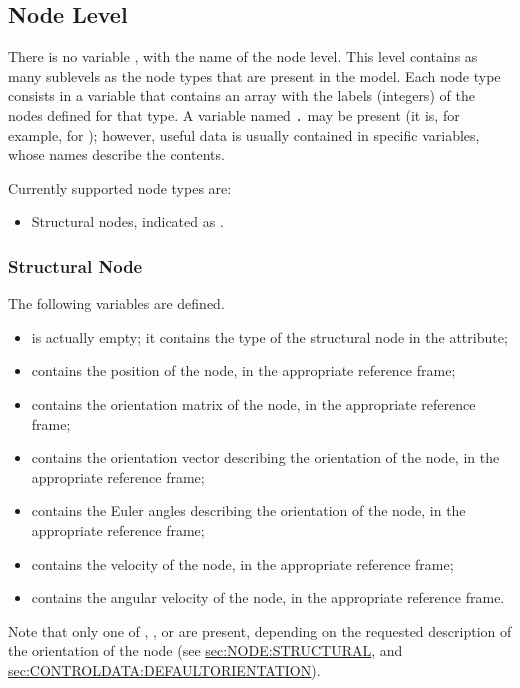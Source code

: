 \subsection{Node Level}
There is no variable , with the name of the node level.
This level contains as many sublevels as the node types
that are present in the model.
Each node type consists in a variable that contains an array
with the labels (integers) of the nodes defined for that type.
A variable named \texttt{.} may be present
(it is, for example, for ); however, useful data is usually
contained in specific variables, whose names describe the contents.

Currently supported node types are:
\begin{itemize}
\item Structural nodes, indicated as .
\end{itemize}



\subsubsection{Structural Node}
\label{sec:NetCDF:Node:Structural Node}
The following variables are defined.
\begin{itemize}
\item {} is actually empty;
it contains the type of the structural node in the  attribute;

\item {} contains the position of the node,
in the appropriate reference frame;

\item {} contains the orientation matrix of the node,
in the appropriate reference frame;

\item {} contains the orientation vector
describing the orientation of the node, in the appropriate reference frame;

\item {} contains the Euler angles
describing the orientation of the node, in the appropriate reference frame;

\item {} contains the velocity
of the node, in the appropriate reference frame;

\item {} contains the angular velocity
of the node, in the appropriate reference frame.
\end{itemize}
Note that only one of , , or  are present,
depending on the requested description of the orientation of the node
(see
\hyperref{\kw{structural node}}{\kw{structural node}, Section~}{}{sec:NODE:STRUCTURAL},
and
\hyperref{\kw{default orientation}}{\kw{default orientation}, Section~}{}{sec:CONTROLDATA:DEFAULTORIENTATION}).

